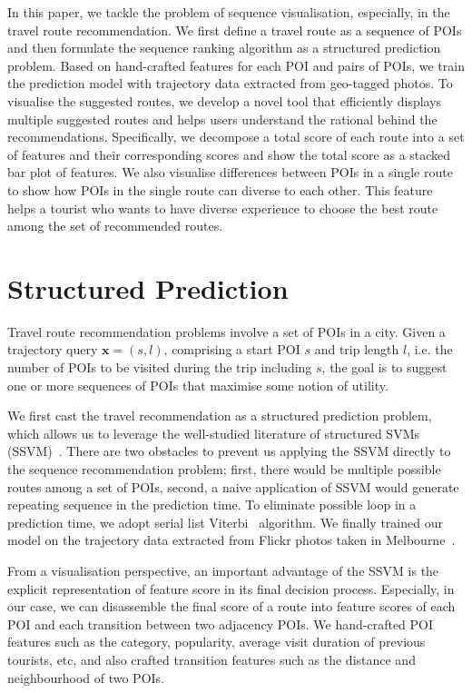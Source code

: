 \documentclass[sigconf]{acmart}
\begin{document}
In this paper, we tackle the problem of sequence visualisation, especially, in the travel route recommendation. We first define a travel route as a sequence of POIs and then formulate the sequence ranking algorithm as a structured prediction problem. Based on hand-crafted features for each POI and pairs of POIs, we train the prediction model with trajectory data extracted from geo-tagged photos. To visualise the suggested routes, we develop a novel tool that efficiently displays multiple suggested routes and helps users understand the rational behind the recommendations. Specifically, we decompose a total score of each route into a set of features and their corresponding scores and show the total score as a stacked bar plot of features. We also visualise differences between POIs in a single route to show how POIs in the single route can diverse to each other. This feature helps a tourist who wants to have diverse experience to choose the best route among the set of recommended routes.

\section{Structured Prediction}
Travel route recommendation problems involve a set of POIs in a city. Given a trajectory query $\mathbf{x} = (s, l)$, comprising a start POI $s$ and trip length $l$, i.e. the number of POIs to be visited during the trip including $s$, the goal is to suggest one or more sequences of POIs that maximise some notion of utility.

We first cast the travel recommendation as a structured prediction problem, which allows us to leverage the well-studied literature of structured SVMs (SSVM)~\cite{tsochantaridis2005large,joachims2009predicting}. There are two obstacles to prevent us applying the SSVM directly to the sequence recommendation problem; first, there would be multiple possible routes among a set of POIs, second, a naive application of SSVM would generate repeating sequence in the prediction time. 
To eliminate possible loop in a prediction time, we adopt serial list Viterbi~\cite{seshadri1994list,nill1995list} algorithm.
We finally trained our model on the trajectory data extracted from Flickr photos taken in Melbourne~\cite{chen2016learning}.

From a visualisation perspective, an important advantage of the SSVM is the explicit representation of feature score in its final decision process. Especially, in our case, we can disassemble the final score of a route into feature scores of each POI and each transition between two adjacency POIs. We hand-crafted POI features such as the category, popularity, average visit duration of previous tourists, etc, and also crafted transition features such as the distance and neighbourhood of two POIs.
\end{document}
